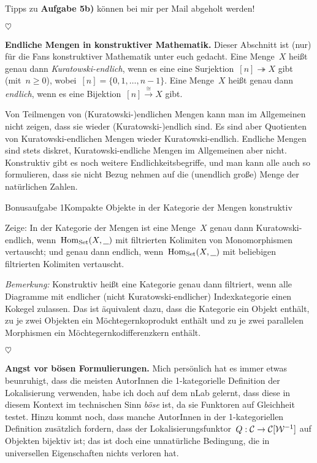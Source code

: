 \documentclass{uebblatt}
\newcommand{\stopper}{\begin{center}$\heartsuit$\end{center}}
\begin{document}
Tipps zu \textbf{Aufgabe 5b)} können bei mir per Mail abgeholt werden!

\stopper

\textbf{Endliche Mengen in konstruktiver Mathematik.} Dieser Abschnitt ist
(nur) für die Fans konstruktiver Mathematik unter euch gedacht.
Eine Menge~$X$ heißt genau dann \emph{Kuratowski-endlich}, wenn es eine
eine Surjektion~$[n] \twoheadrightarrow X$ gibt (mit~$n \geq 0$), wobei~$[n] =
\{0,1,\ldots,n-1\}$. Eine Menge~$X$ heißt genau dann \emph{endlich}, wenn es
eine Bijektion~$[n] \stackrel{\cong}{\to} X$ gibt.

Von Teilmengen von (Kuratowski-)endlichen Mengen kann man im Allgemeinen nicht
zeigen, dass sie wieder (Kuratowski-)endlich sind. Es sind aber Quotienten von
Kuratowski-endlichen Mengen wieder Kuratowski-endlich. Endliche Mengen sind
stets diskret, Kura\-towski-endliche Mengen im Allgemeinen aber nicht.
Konstruktiv gibt es noch weitere Endlichkeitsbegriffe, und man kann alle auch
so formulieren, dass sie nicht Bezug nehmen auf die (unendlich große) Menge der
natürlichen Zahlen.

\begin{aufgabe*}{Bonusaufgabe 1}{Kompakte Objekte in der Kategorie der Mengen konstruktiv}

Zeige: In der Kategorie der Mengen ist eine Menge~$X$ genau dann
Kuratowski-endlich, wenn~$\mathrm{Hom}_{\mathrm{Set}}(X,\underline{\ \ })$ mit filtrierten
Kolimiten von Monomorphismen vertauscht; und genau dann endlich,
wenn~$\mathrm{Hom}_{\mathrm{Set}}(X,\underline{\ \ })$ mit beliebigen filtrierten Kolimiten
vertauscht.

\emph{Bemerkung:} Konstruktiv heißt eine Kategorie genau dann filtriert, wenn
alle Diagramme mit endlicher (nicht Kuratowski-endlicher) Indexkategorie einen
Kokegel zulassen. Das ist äquivalent dazu, dass die Kategorie ein Objekt
enthält, zu je zwei Objekten ein Möchtegernkoprodukt enthält und zu je zwei
parallelen Morphismen ein Möch\-te\-gern\-ko\-dif\-fe\-renz\-kern enthält.
\end{aufgabe*}
\vspace{-1em}

\stopper

\textbf{Angst vor bösen Formulierungen.}
Mich persönlich hat es immer etwas beunruhigt, dass die meisten AutorInnen die
1-kategorielle Definition der Lokalisierung verwenden, habe ich doch auf dem
nLab gelernt, dass diese in diesem Kontext im technischen Sinn \emph{böse} ist,
da sie Funktoren auf Gleichheit testet. Hinzu kommt noch, dass manche AutorInnen
in der 1-kategoriellen Definition zusätzlich fordern, dass der
Lokalisierungsfunktor~$Q : \mathcal{C} \to \mathcal{C}[\mathcal{W}^{-1}]$ auf Objekten bijektiv ist; das
ist doch eine unnatürliche Bedingung, die in universellen Eigenschaften nichts
verloren hat.
\end{document}
